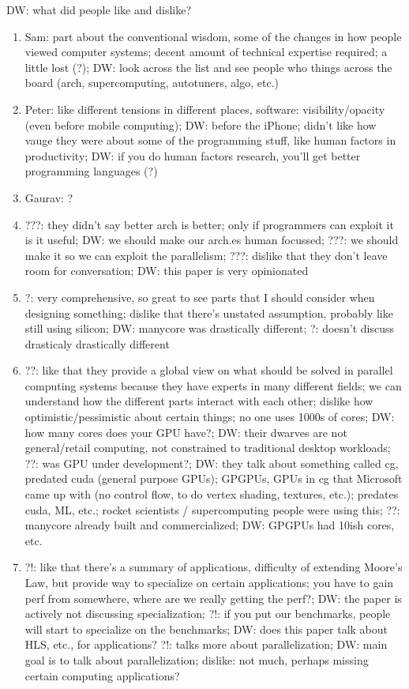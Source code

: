 DW: what did people like and dislike?
\begin{enumerate}
    \item Sam: part about the conventional wisdom, some of the changes in how people viewed computer systems; decent amount of technical expertise required; a little lost (?); DW: look across the list and see people who things across the board (arch, supercomputing, autotuners, algo, etc.)
    \item Peter: like different tensions in different places, software: visibility/opacity (even before mobile computing); DW: before the iPhone; didn't like how vauge they were about some of the programming stuff, like human factors in productivity; DW: if you do human factors research, you'll get better programming languages (?)
    \item Gaurav: ?
    \item ???: they didn't say better arch is better; only if programmers can exploit it is it useful; DW: we should make our arch.es human focussed; ???: we should make it so we can exploit the parallelism; ???: dislike that they don't leave room for conversation; DW: this paper is very opinionated
    \item ?: very comprehensive, so great to see parts that I should consider when designing something; dislike that there's unstated assumption, probably like still using silicon; DW: manycore was drastically different; ?: doesn't discuss drasticaly drastically different
    \item ??: like that they provide a global view on what should be solved in parallel computing systems because they have experts in many different fields; we can understand how the different parts interact with each other; dislike how optimistic/pessimistic about certain things; no one uses 1000s of cores; DW: how many cores does your GPU have?; DW: their dwarves are not general/retail computing, not constrained to traditional desktop workloads; ??: was GPU under development?; DW: they talk about something called cg, predated cuda (general purpose GPUs); GPGPUs, GPUs in cg that Microsoft came up with (no control flow, to do vertex shading, textures, etc.); predates cuda, ML, etc.; rocket scientists / supercomputing people were using this; ??: manycore already built and commercialized; DW: GPGPUs had 10ish cores, etc.
    \item ?!: like that there's a summary of applications, difficulty of extending Moore's Law, but provide way to specialize on certain applications; you have to gain perf from somewhere, where are we really getting the perf?; DW: the paper is actively not discussing specialization; ?!: if you put our benchmarks, people will start to specialize on the benchmarks; DW: does this paper talk about HLS, etc., for applications? ?!: talks more about parallelization; DW: main goal is to talk about parallelization; dislike: not much, perhaps missing certain computing applications?

\end{enumerate}
